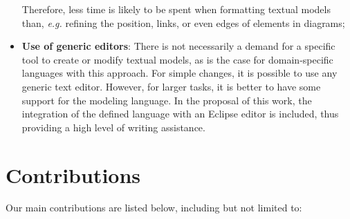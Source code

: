 \begin{itemize}
    Therefore, less time is likely to be spent when formatting textual models than, \textit{e.g.} refining the position, links, or even edges of elements in diagrams;
    \item \textbf{Use of generic editors}: 
    There is not necessarily a demand for a specific tool to create or modify textual models, as is the case for domain-specific languages with this approach.
    For simple changes, it is possible to use any generic text editor.
    However, for larger tasks, it is better to have some support for the modeling language.
    In the proposal of this work, the integration of the defined language with an Eclipse editor is included, thus providing a high level of writing assistance.
\end{itemize}


\section{Contributions}

Our main contributions are listed below, including but not limited to:

